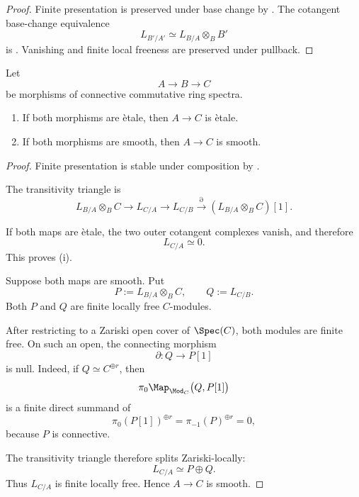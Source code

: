 \begin{proof}
Finite presentation is preserved under base change by
. The cotangent base-change
equivalence
\[
    L_{B'/A'}
    \simeq
    L_{B/A}\otimes_BB'
\]
is . Vanishing and finite local freeness are
preserved under pullback.
\end{proof}

\begin{proposition}
\label{prop:smooth-etale-composition}
Let
\[
    A
    \longrightarrow
    B
    \longrightarrow
    C
\]
be morphisms of connective commutative ring spectra.
\begin{enumerate}[label=(\roman*)]
    \item If both morphisms are \`etale, then $A\to C$ is \`etale.

    \item If both morphisms are smooth, then $A\to C$ is smooth.
\end{enumerate}
\end{proposition}

\begin{proof}
Finite presentation is stable under composition by
.

The transitivity triangle is
\[
    L_{B/A}\otimes_BC
    \longrightarrow
    L_{C/A}
    \longrightarrow
    L_{C/B}
    \xrightarrow{\partial}
    (L_{B/A}\otimes_BC)[1].
\]

If both maps are \`etale, the two outer cotangent complexes vanish, and
therefore
\[
    L_{C/A}
    \simeq
    0.
\]
This proves (i).

Suppose both maps are smooth. Put
\[
    P
    :=
    L_{B/A}\otimes_BC,
    \qquad
    Q
    :=
    L_{C/B}.
\]
Both $P$ and $Q$ are finite locally free $C$-modules.

After restricting to a Zariski open cover of $\Spec(C)$, both modules are
finite free. On such an open, the connecting morphism
\[
    \partial
    \colon
    Q
    \longrightarrow
    P[1]
\]
is null. Indeed, if $Q\simeq C^{\oplus r}$, then
\[
    \pi_0
    \Map_{\Mod_C}
    \bigl(
        Q,
        P[1]
    \bigr)
\]
is a finite direct summand of
\[
    \pi_0(P[1])^{\oplus r}
    =
    \pi_{-1}(P)^{\oplus r}
    =
    0,
\]
because $P$ is connective.

The transitivity triangle therefore splits Zariski-locally:
\[
    L_{C/A}
    \simeq
    P\oplus Q.
\]
Thus $L_{C/A}$ is finite locally free. Hence $A\to C$ is smooth.
\end{proof}

